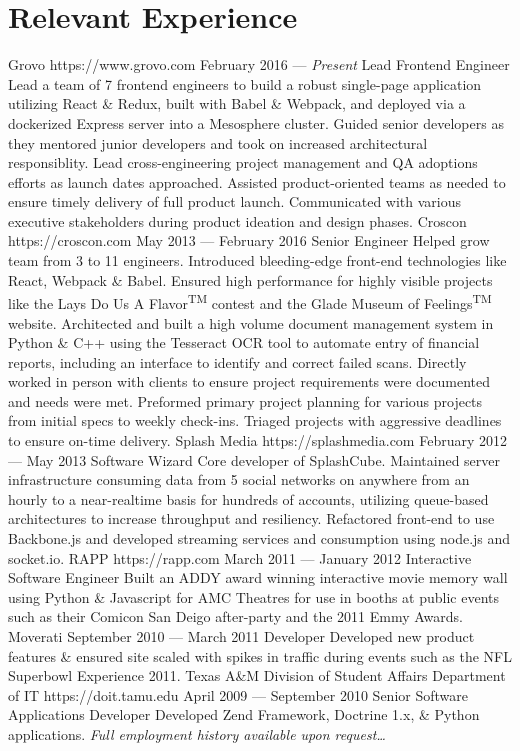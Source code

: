 \documentclass{resume}
\begin{document}
\smallskip

\section{Relevant Experience}

\employer
	{Grovo}
	{https://www.grovo.com}
	{February 2016 --- \emph{Present}}
	{Lead Frontend Engineer}
	{Lead a team of 7 frontend engineers to build a robust single-page application utilizing React \& Redux, built with Babel \& Webpack, and deployed via a dockerized Express server into a Mesosphere cluster. Guided senior developers as they mentored junior developers and took on increased architectural responsiblity. Lead cross-engineering project management and QA adoptions efforts as launch dates approached. Assisted product-oriented teams as needed to ensure timely delivery of full product launch. Communicated with various executive stakeholders during product ideation and design phases.}
\employer
	{Croscon}
	{https://croscon.com}
	{May 2013 --- February 2016}
	{Senior Engineer}
	{Helped grow team from 3 to 11 engineers. Introduced bleeding-edge front-end technologies like React, Webpack \& Babel. Ensured high performance for highly visible projects like the Lays\textsuperscript{\textregistered} Do Us A Flavor\textsuperscript{TM} contest and the Glade\textsuperscript{\textregistered} Museum of Feelings\textsuperscript{TM} website. Architected and built a high volume document management system in Python \& C++ using the Tesseract OCR tool to automate entry of financial reports, including an interface to identify and correct failed scans. Directly worked in person with clients to ensure project requirements were documented and needs were met. Preformed primary project planning for various projects from initial specs to weekly check-ins. Triaged projects with aggressive deadlines to ensure on-time delivery.}
\employer
	{Splash Media}
	{https://splashmedia.com}
	{February 2012 --- May 2013}
	{Software Wizard}
	{Core developer of SplashCube. Maintained server infrastructure consuming data from 5 social networks on anywhere from an hourly to a near-realtime basis for hundreds of accounts, utilizing queue-based architectures to increase throughput and resiliency. Refactored front-end to use Backbone.js and developed streaming services and consumption using node.js and socket.io.}
\employer
	{RAPP}
	{https://rapp.com}
	{March 2011 --- January 2012}
	{Interactive Software Engineer}
	{Built an ADDY award winning interactive movie memory wall using Python \& Javascript for AMC Theatres for use in booths at public events such as their Comicon San Deigo after-party and the 2011 Emmy Awards.}
\employer
	{Moverati}
	{}
	{September 2010 --- March 2011}
	{Developer}
	{Developed new product features \& ensured site scaled with spikes in traffic during events such as the NFL Superbowl Experience 2011.}
\employer
	{Texas A\&M Division of Student Affairs Department of IT}
	{https://doit.tamu.edu}
	{April 2009 --- September 2010}
	{Senior Software Applications Developer}
	{Developed Zend Framework, Doctrine 1.x, \& Python applications.}
\emph{Full employment history available upon request\ldots}
\end{document}
